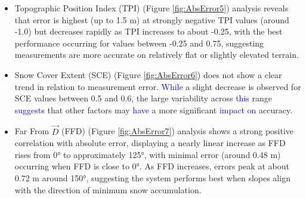 \documentclass[preprint,12pt]{elsarticle}
\begin{document}
\begin{itemize}
     \item Topographic Position Index (TPI) (Figure \ref{fig:AbsError5}) analysis reveals that error is highest (up to 1.5 m) at strongly negative TPI values (around -1.0) but decreases rapidly as TPI increases to about -0.25, with the best performance occurring for values between -0.25 and 0.75, suggesting measurements are more accurate on relatively flat or slightly elevated terrain. %
     
     \item Snow Cover Extent (SCE) (Figure \ref{fig:AbsError6}) does not show a clear trend in relation to measurement error. \textcolor{blue}{While} a slight decrease is observed for SCE values between 0.5 and 0.6, the large variability across \textcolor{blue}{this} range \textcolor{blue}{suggests} that other factors may \textcolor{blue}{have} a more significant \textcolor{blue}{impact on} accuracy. %
     
     \item Far From $\Vec{D}$ (FFD) (Figure \ref{fig:AbsError7}) analysis shows a strong positive correlation with absolute error, displaying a nearly linear increase as FFD rises from 0° to approximately 125°, with minimal error (around 0.48 m) occurring when FFD is close to 0°. As FFD increases, errors peak at about 0.72 m around 150°, suggesting the system performs best when slopes align with the direction of minimum snow accumulation. %
\end{itemize}
\end{document}
